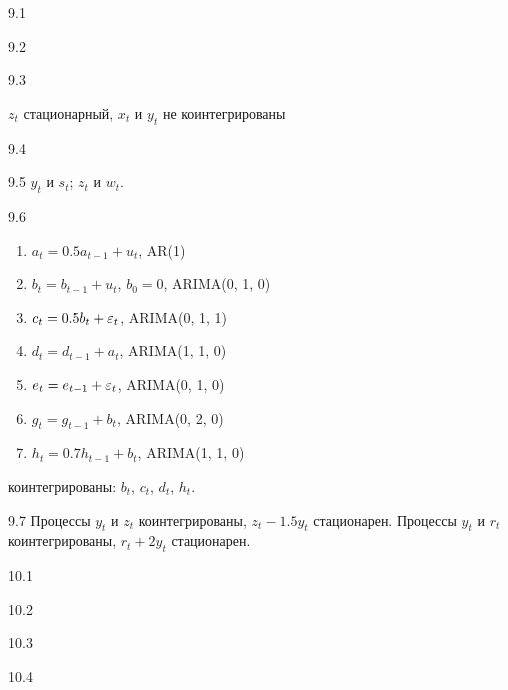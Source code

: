 \protect \hypertarget {soln:9.1}{}
\begin{solution}{{9.1}}

\end{solution}
\protect \hypertarget {soln:9.2}{}
\begin{solution}{{9.2}}

\end{solution}
\protect \hypertarget {soln:9.3}{}
\begin{solution}{{9.3}}

$z_t$ стационарный, $x_t$ и $y_t$ не коинтегрированы
\end{solution}
\protect \hypertarget {soln:9.4}{}
\begin{solution}{{9.4}}

\end{solution}
\protect \hypertarget {soln:9.5}{}
\begin{solution}{{9.5}}
$y_t$ и $s_t$; $z_t$ и $w_t$.
\end{solution}
\protect \hypertarget {soln:9.6}{}
\begin{solution}{{9.6}}
  \begin{enumerate}
    \item $a_t = 0.5 a_{t-1} + u_t$, AR(1)
    \item $b_t = b_{t-1} + u_t$, $b_0 = 0$, ARIMA(0, 1, 0)
    \item $c_t = 0.5 b_t + \varepsilon_t$, ARIMA(0, 1, 1)
    \item $d_t = d_{t-1} + a_t$, ARIMA(1, 1, 0)
    \item $e_t = e_{t-1} + \varepsilon_t$, ARIMA(0, 1, 0)
    \item $g_t = g_{t-1} + b_t$, ARIMA(0, 2, 0)
    \item $h_t = 0.7 h_{t-1} + b_t$, ARIMA(1, 1, 0)
  \end{enumerate}
  коинтегрированы: $b_t$, $c_t$, $d_t$, $h_t$.
\end{solution}
\protect \hypertarget {soln:9.7}{}
\begin{solution}{{9.7}}
Процессы $y_t$ и $z_t$ коинтегрированы, $z_t - 1.5y_t$ стационарен.
Процессы $y_t$ и $r_t$ коинтегрированы, $r_t + 2y_t$ стационарен.
\end{solution}
\protect \hypertarget {soln:10.1}{}
\begin{solution}{{10.1}}
\end{solution}
\protect \hypertarget {soln:10.2}{}
\begin{solution}{{10.2}}
\end{solution}
\protect \hypertarget {soln:10.3}{}
\begin{solution}{{10.3}}
\end{solution}
\protect \hypertarget {soln:10.4}{}
\begin{solution}{{10.4}}
\end{solution}
